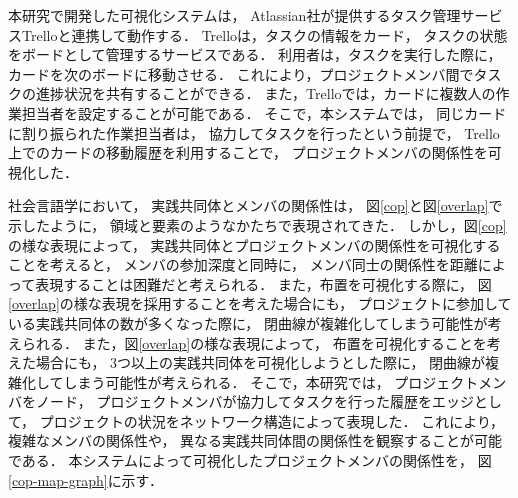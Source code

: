 

本研究で開発した可視化システムは，
Atlassian社が提供するタスク管理サービスTrello\cite{trello}と連携して動作する．
Trelloは，タスクの情報をカード，
タスクの状態をボードとして管理するサービスである．
利用者は，タスクを実行した際に，
カードを次のボードに移動させる．
これにより，プロジェクトメンバ間でタスクの進捗状況を共有することができる．
また，Trelloでは，カードに複数人の作業担当者を設定することが可能である．
そこで，本システムでは，
同じカードに割り振られた作業担当者は，
協力してタスクを行ったという前提で，
Trello上でのカードの移動履歴を利用することで，
プロジェクトメンバの関係性を可視化した．

社会言語学において，
実践共同体とメンバの関係性は，
図\ref{cop}と図\ref{overlap}で示したように，
領域と要素のようなかたちで表現されてきた．
しかし，図\ref{cop}の様な表現によって，
実践共同体とプロジェクトメンバの関係性を可視化することを考えると，
メンバの参加深度と同時に，
メンバ同士の関係性を距離によって表現することは困難だと考えられる．
また，布置を可視化する際に，
図\ref{overlap}の様な表現を採用することを考えた場合にも，
プロジェクトに参加している実践共同体の数が多くなった際に，
閉曲線が複雑化してしまう可能性が考えられる．
また，図\ref{overlap}の様な表現によって，
布置を可視化することを考えた場合にも，
3つ以上の実践共同体を可視化しようとした際に，
閉曲線が複雑化してしまう可能性が考えられる．
そこで，本研究では，
プロジェクトメンバをノード，
プロジェクトメンバが協力してタスクを行った履歴をエッジとして，
プロジェクトの状況をネットワーク構造によって表現した．
これにより，複雑なメンバの関係性や，
異なる実践共同体間の関係性を観察することが可能である．
本システムによって可視化したプロジェクトメンバの関係性を，
図\ref{cop-map-graph}に示す．

